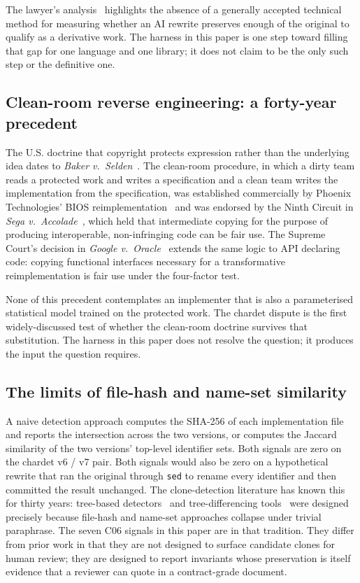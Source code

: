 \documentclass[11pt,letterpaper]{article}
\begin{document}
The lawyer's analysis~\cite{meeker2026chardet} highlights the absence
of a generally accepted technical method for measuring whether an AI
rewrite preserves enough of the original to qualify as a derivative
work. The harness in this paper is one step toward filling that gap
for one language and one library; it does not claim to be the only
such step or the definitive one.

\subsection{Clean-room reverse engineering: a forty-year precedent}
\label{sec:clean-room}

The U.S. doctrine that copyright protects expression rather than the
underlying idea dates to \emph{Baker v.\
Selden}~\cite{bakervseldon1880}. The clean-room procedure, in which a
dirty team reads a protected work and writes a specification and a
clean team writes the implementation from the specification, was
established commercially by Phoenix Technologies' BIOS
reimplementation~\cite{phoenixvsibm1984} and was endorsed by the Ninth
Circuit in \emph{Sega v.\ Accolade}~\cite{segavsaccolade1992}, which
held that intermediate copying for the purpose of producing
interoperable, non-infringing code can be fair use. The Supreme
Court's decision in \emph{Google v.\ Oracle}~\cite{googlevsoracle2021}
extends the same logic to API declaring code: copying functional
interfaces necessary for a transformative reimplementation is fair
use under the four-factor test.

None of this precedent contemplates an implementer that is also a
parameterised statistical model trained on the protected work. The
chardet dispute is the first widely-discussed test of whether the
clean-room doctrine survives that substitution. The harness in this
paper does not resolve the question; it produces the input the
question requires.

\subsection{The limits of file-hash and name-set similarity}
\label{sec:limits}

A naive detection approach computes the SHA-256 of each implementation
file and reports the intersection across the two versions, or computes
the Jaccard similarity of the two versions' top-level identifier sets.
Both signals are zero on the chardet v6 / v7 pair. Both signals would
also be zero on a hypothetical rewrite that ran the original through
\texttt{sed} to rename every identifier and then committed the result
unchanged. The clone-detection literature has known this for thirty
years: tree-based detectors~\cite{baxter1998clone,jiang2007deckard} and
tree-differencing tools~\cite{falleri2014gumtree} were designed
precisely because file-hash and name-set approaches collapse under
trivial paraphrase. The seven C06 signals in this paper are in that
tradition. They differ from prior work in that they are not designed
to surface candidate clones for human review; they are designed to
report invariants whose preservation is itself evidence that a
reviewer can quote in a contract-grade document.
\end{document}
